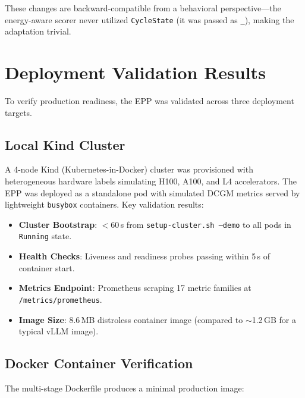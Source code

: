 These changes are backward-compatible from a behavioral perspective---the energy-aware scorer never utilized \texttt{CycleState} (it was passed as \texttt{\_}), making the adaptation trivial.



\section{Deployment Validation Results}
\label{sec:deployment-validation}

To verify production readiness, the EPP was validated across three deployment targets.

\subsection{Local Kind Cluster}
\label{subsec:kind-validation}

A 4-node Kind (Kubernetes-in-Docker) cluster was provisioned with heterogeneous hardware labels simulating H100, A100, and L4 accelerators. The EPP was deployed as a standalone pod with simulated DCGM metrics served by lightweight \texttt{busybox} containers. Key validation results:

\begin{itemize}
    \item \textbf{Cluster Bootstrap}: $<$60\,s from \texttt{setup-cluster.sh --demo} to all pods in \texttt{Running} state.
    \item \textbf{Health Checks}: Liveness and readiness probes passing within 5\,s of container start.
    \item \textbf{Metrics Endpoint}: Prometheus scraping 17 metric families at \texttt{/metrics/prometheus}.
    \item \textbf{Image Size}: 8.6\,MB distroless container image (compared to $\sim$1.2\,GB for a typical vLLM image).
\end{itemize}

\subsection{Docker Container Verification}
\label{subsec:docker-validation}

The multi-stage Dockerfile produces a minimal production image:

